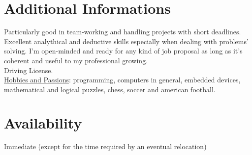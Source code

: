 \documentclass[margin]{res}
\begin{document}
\begin{resume}
\section{Additional Informations}
Particularly good in team-working and handling projects with short deadlines. Excellent
analythical and deductive skills especially when dealing with problems' solving. I'm open-minded
and ready for any kind of job proposal as long as it's coherent and useful to my professional growing. \\
Driving License. \\
\underline{Hobbies and Passions}: programming, computers in general, embedded devices, mathematical and
logical puzzles, chess, soccer and american football.

\section{Availability}
Immediate (except for the time required by an eventual relocation)

\end{resume} 
\end{document}
